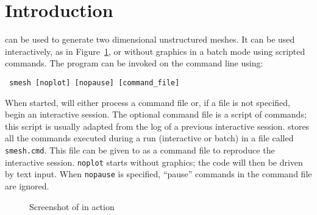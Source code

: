 \documentclass[letterpaper,12pt]{article}
\begin{document}
\tableofcontents

\section{Introduction}
\smesh can be used to generate two dimensional unstructured meshes.
It can be used interactively, as in Figure~\ref{fig:smeshgui}, or
without graphics in a batch mode using scripted commands.  The program
can be invoked on the command line using:
\begin{verbatim}
 smesh [noplot] [nopause] [command_file]
\end{verbatim}
When started, \smesh will either process a command file or, if a file
is not specified, begin an interactive session. The optional command
file is a script of \smesh commands; this script is usually adapted
from the log of a previous interactive session.  \smesh stores all the
commands executed during a run (interactive or batch) in a file called
{\tt smesh.cmd}.  This file can be given to \smesh as a command file
to reproduce the interactive session.  {\tt noplot} starts \smesh
without graphics; the code will then be driven by text input.  When
{\tt nopause} is specified, ``pause'' commands in the command file are
ignored.
\begin{figure}[htb]
\begin{center}
\end{center}
\caption{Screenshot of \smesh in action}\label{fig:smeshgui}
\end{figure}
\end{document}
